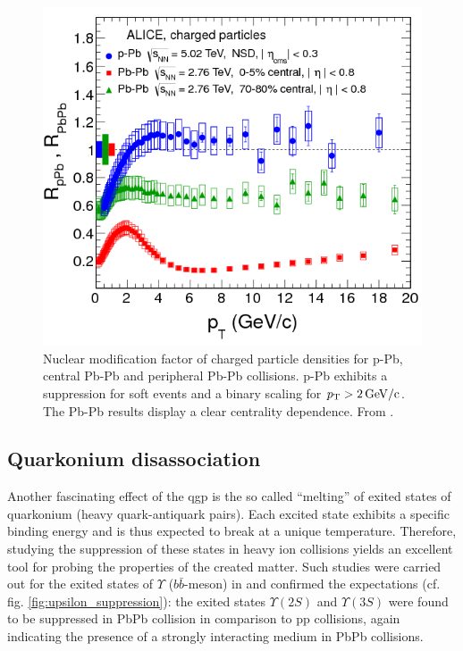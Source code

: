 \begin{figure}
  \centering
  \includegraphics[width=.6\textwidth]{figures/RAA_pPb_PbPb_Alice.png}
  \caption[Nuclear modification factor of charged particle densities for p-Pb, central Pb-Pb and peripheral Pb-Pb collisions.]{Nuclear modification factor of charged particle densities for p-Pb, central Pb-Pb and peripheral Pb-Pb collisions. p-Pb exhibits a suppression for soft events and a binary scaling for $p_{\text{T}} > \SI{2}{GeV/c}$. The Pb-Pb results display a clear centrality dependence. From \cite{Abelev2013}.}
  \label{fig:RAA}
\end{figure}

\subsection{Quarkonium disassociation}
\label{sec:quarkonium}

Another fascinating effect of the \gls{qgp} is the so called ``melting'' of exited states of quarkonium (heavy quark-antiquark pairs). Each excited state exhibits a specific binding energy and is thus expected to break at a unique temperature. Therefore, studying the suppression of these states in heavy ion collisions yields an excellent tool for probing the properties of the created matter. Such studies were carried out for the exited states of $\Upsilon$ ($b\bar{b}$-meson) in \cite{Chatrchyan2011} and confirmed the expectations (cf. fig. \ref{fig:upsilon_suppression}): the exited states $\Upsilon(2S)$ and $\Upsilon(3S)$ were found to be suppressed in \gls{PbPb} collision in comparison to \gls{pp} collisions, again indicating the presence of a strongly interacting medium in \gls{PbPb} collisions.

